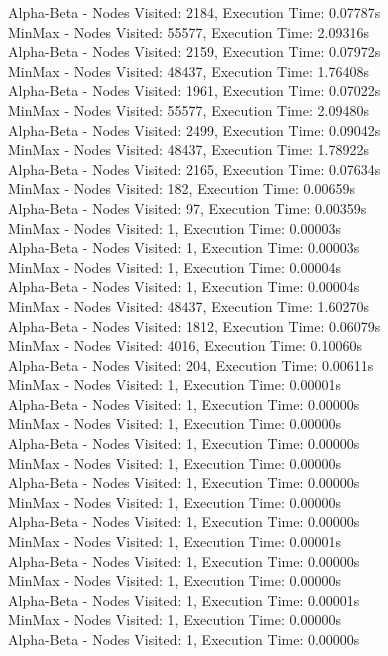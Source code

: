 \documentclass{article}
\begin{document}
Alpha-Beta - Nodes Visited: 2184, Execution Time: 0.07787s\\
MinMax - Nodes Visited: 55577, Execution Time: 2.09316s\\
Alpha-Beta - Nodes Visited: 2159, Execution Time: 0.07972s\\
MinMax - Nodes Visited: 48437, Execution Time: 1.76408s\\
Alpha-Beta - Nodes Visited: 1961, Execution Time: 0.07022s\\
MinMax - Nodes Visited: 55577, Execution Time: 2.09480s\\
Alpha-Beta - Nodes Visited: 2499, Execution Time: 0.09042s\\
MinMax - Nodes Visited: 48437, Execution Time: 1.78922s\\
Alpha-Beta - Nodes Visited: 2165, Execution Time: 0.07634s\\
MinMax - Nodes Visited: 182, Execution Time: 0.00659s\\
Alpha-Beta - Nodes Visited: 97, Execution Time: 0.00359s\\
MinMax - Nodes Visited: 1, Execution Time: 0.00003s\\
Alpha-Beta - Nodes Visited: 1, Execution Time: 0.00003s\\
MinMax - Nodes Visited: 1, Execution Time: 0.00004s\\
Alpha-Beta - Nodes Visited: 1, Execution Time: 0.00004s\\
MinMax - Nodes Visited: 48437, Execution Time: 1.60270s\\
Alpha-Beta - Nodes Visited: 1812, Execution Time: 0.06079s\\
MinMax - Nodes Visited: 4016, Execution Time: 0.10060s\\
Alpha-Beta - Nodes Visited: 204, Execution Time: 0.00611s\\
MinMax - Nodes Visited: 1, Execution Time: 0.00001s\\
Alpha-Beta - Nodes Visited: 1, Execution Time: 0.00000s\\
MinMax - Nodes Visited: 1, Execution Time: 0.00000s\\
Alpha-Beta - Nodes Visited: 1, Execution Time: 0.00000s\\
MinMax - Nodes Visited: 1, Execution Time: 0.00000s\\
Alpha-Beta - Nodes Visited: 1, Execution Time: 0.00000s\\
MinMax - Nodes Visited: 1, Execution Time: 0.00000s\\
Alpha-Beta - Nodes Visited: 1, Execution Time: 0.00000s\\
MinMax - Nodes Visited: 1, Execution Time: 0.00001s\\
Alpha-Beta - Nodes Visited: 1, Execution Time: 0.00000s\\
MinMax - Nodes Visited: 1, Execution Time: 0.00000s\\
Alpha-Beta - Nodes Visited: 1, Execution Time: 0.00001s\\
MinMax - Nodes Visited: 1, Execution Time: 0.00000s\\
Alpha-Beta - Nodes Visited: 1, Execution Time: 0.00000s\\
\end{document}
